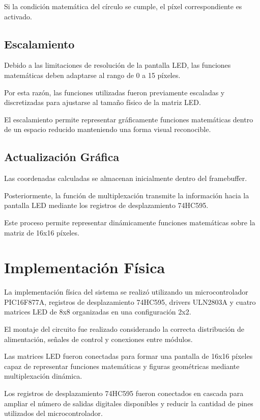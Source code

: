 Si la condición matemática del círculo se cumple, el píxel correspondiente es activado.

\subsection{Escalamiento}

Debido a las limitaciones de resolución de la pantalla LED, las funciones matemáticas deben adaptarse al rango de 0 a 15 píxeles.

Por esta razón, las funciones utilizadas fueron previamente escaladas y discretizadas para ajustarse al tamaño físico de la matriz LED.

El escalamiento permite representar gráficamente funciones matemáticas dentro de un espacio reducido manteniendo una forma visual reconocible.

\subsection{Actualización Gráfica}

Las coordenadas calculadas se almacenan inicialmente dentro del framebuffer.

Posteriormente, la función de multiplexación transmite la información hacia la pantalla LED mediante los registros de desplazamiento 74HC595.

Este proceso permite representar dinámicamente funciones matemáticas sobre la matriz de 16x16 píxeles.

\section{Implementación Física}

La implementación física del sistema se realizó utilizando un microcontrolador PIC16F877A, registros de desplazamiento 74HC595, drivers ULN2803A y cuatro matrices LED de 8x8 organizadas en una configuración 2x2.

El montaje del circuito fue realizado considerando la correcta distribución de alimentación, señales de control y conexiones entre módulos.

Las matrices LED fueron conectadas para formar una pantalla de 16x16 píxeles capaz de representar funciones matemáticas y figuras geométricas mediante multiplexación dinámica.

Los registros de desplazamiento 74HC595 fueron conectados en cascada para ampliar el número de salidas digitales disponibles y reducir la cantidad de pines utilizados del microcontrolador.

